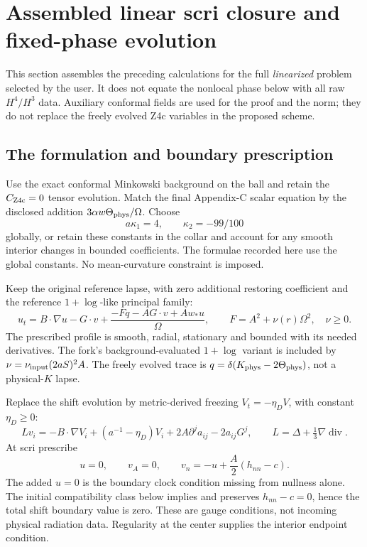 \section{Assembled linear scri closure and fixed-phase evolution}
\label{sec:assembled-linear-closure}

This section assembles the preceding calculations for the full
\emph{linearized} problem selected by the user. It does not equate the
nonlocal phase below with all raw $H^4/H^3$ data. Auxiliary conformal
fields are used for the proof and the norm; they do not replace the
freely evolved Z4c variables in the proposed scheme.

\subsection{The formulation and boundary prescription}
Use the exact conformal Minkowski background on the ball and retain
the $C_{\rm Z4c}=0$ tensor evolution. Match the final Appendix-C scalar
equation by the disclosed addition $3\alpha w\Theta_{\rm phys}/\Omega$.
Choose
\[
 a\kappa_1=4,\qquad \kappa_2=-99/100
\]
globally, or retain these constants in the collar and account for any
smooth interior changes in bounded coefficients. The formulae recorded
here use the global constants. No mean-curvature constraint is imposed.

Keep the original reference lapse, with zero additional restoring
coefficient and the reference $1+\log$-like principal family:
\[
\boxed{
u_t=B\cdot\nabla u-G\cdot v+
\frac{-Fq-AG\cdot v+Aw_*u}{\Omega},\qquad
F=A^2+\nu(r)\Omega^2,\quad \nu\geq0 .
}
\]
The prescribed profile is smooth, radial, stationary and bounded with its
needed derivatives. The fork's background-evaluated $1+\log$ variant
is included by $\nu=\nu_{\rm input}(2aS)^2A$.
The freely evolved trace is $q=\delta(K_{\rm phys}-2\Theta_{\rm phys})$,
not a physical-$K$ lapse.

Replace the shift evolution by metric-derived freezing
$V_t=-\eta_D V$, with constant $\eta_D\geq0$:
\[
\boxed{
Lv_i=-B\cdot\nabla V_i+(a^{-1}-\eta_D)V_i
       +2A\partial^ja_{ij}-2a_{ij}G^j,\qquad
L=\Delta+\tfrac13\nabla\operatorname{div}.
}
\]
At scri prescribe
\[
\boxed{
u=0,\qquad v_A=0,\qquad
v_n=-u+\frac A2(h_{nn}-c).
}
\]
The added $u=0$ is the boundary clock condition missing from nullness alone.
The initial compatibility class below implies and preserves
$h_{nn}-c=0$, hence the total shift boundary value is zero.
These are gauge conditions, not incoming physical radiation data.
Regularity at the center supplies the interior endpoint condition.


